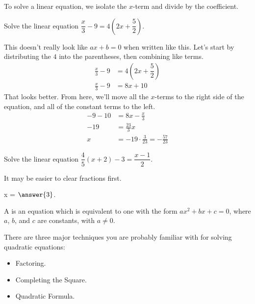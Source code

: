 \documentclass{ximera}
\begin{document}
To solve a linear equation, we isolate the $x$-term and divide by the coefficient.
\begin{example}
	Solve the linear equation $\displaystyle \dfrac{x}{3} - 9 = 4\left( 2x + \dfrac{5}{2} \right)$.

	\begin{explanation}
		This doesn't really look like $ax + b = 0$ when written like this.  Let's start by distributing the $4$ into 
		the parentheses, then combining like terms.
		\begin{align*}
			\frac{x}{3} - 9 &= 4\left( 2x + \dfrac{5}{2} \right) \\
			\frac{x}{3} - 9 &= 8x + 10
		\end{align*}
		That looks better.  From here, we'll move all the $x$-terms to the right side of the equation, and all of
		the constant terms to the left.
		\begin{align*}
			- 9 - 10 &= 8x - \frac{x}{3}\\
			-19 &= \frac{23}{3} x \\
			x &= -19 \cdot \frac{3}{23} = -\frac{57}{23}
		\end{align*}
	\end{explanation}	
\end{example}


\begin{question}
 	Solve the linear equation $\displaystyle \dfrac{4}{5}\left(x+2\right) - 3 = \dfrac{x-1}{2}$. 
 	\begin{hint}
    		It may be easier to clear fractions first.
	\end{hint}
  	\begin{prompt}
    		x = $\answer{3}$.
  	\end{prompt}
\end{question}

\begin{definition}
	A  is an equation which is equivalent to one with the form
	$ax^2 + bx + c = 0$, where $a$, $b$, and $c$ are constants, with $a \neq 0$.
\end{definition}
There are three major techniques you are probably familiar with for solving quadratic equations:
\begin{itemize}
	\item Factoring.
	\item Completing the Square.
	\item Quadratic Formula.
\end{itemize}
\end{document}
